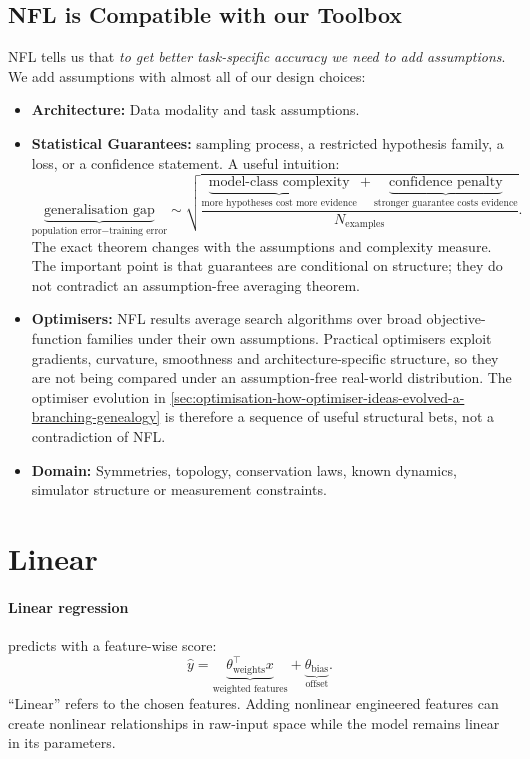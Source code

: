 \subsection{NFL is Compatible with our Toolbox}
NFL tells us that \textit{to get better task-specific accuracy we need to add assumptions}.
We add assumptions with almost all of our design choices:
\begin{itemize}
    \item \textbf{Architecture:} Data modality and task assumptions.
    \item \textbf{Statistical Guarantees:} sampling process, a restricted hypothesis family, a loss, or a confidence statement.
    A useful intuition:
    \[
        \underbrace{\text{generalisation gap}}_{\text{population error} - \text{training error}}
        \sim
        \sqrt{\frac{\underbrace{\text{model-class complexity}}_{\text{more hypotheses cost more evidence}}+\underbrace{\text{confidence penalty}}_{\text{stronger guarantee costs evidence}}}{N_{\text{examples}}}}.
    \]
    The exact theorem changes with the assumptions and complexity measure.
    The important point is that guarantees are conditional on structure; they do not contradict an assumption-free averaging theorem.
    \item \textbf{Optimisers:} NFL results average search algorithms over broad objective-function families under their own assumptions.
    Practical optimisers exploit gradients, curvature, smoothness and architecture-specific structure, so they are not being compared under an assumption-free real-world distribution.
    The optimiser evolution in \cref{sec:optimisation-how-optimiser-ideas-evolved-a-branching-genealogy} is therefore a sequence of useful structural bets, not a contradiction of NFL.
    \item \textbf{Domain:} Symmetries, topology, conservation laws, known dynamics, simulator structure or measurement constraints.
\end{itemize}



\section{Linear}
\label{sec:models-linear-models-a-transparent-baseline}
\paragraph{Linear regression} predicts with a feature-wise score:
\[
    \hat y=\underbrace{\theta_{\text{weights}}^\top x}_{\text{weighted features}}+\underbrace{\theta_{\text{bias}}}_{\text{offset}}.
\]
``Linear'' refers to the chosen features.
Adding nonlinear engineered features can create nonlinear relationships in raw-input space while the model remains linear in its parameters.
